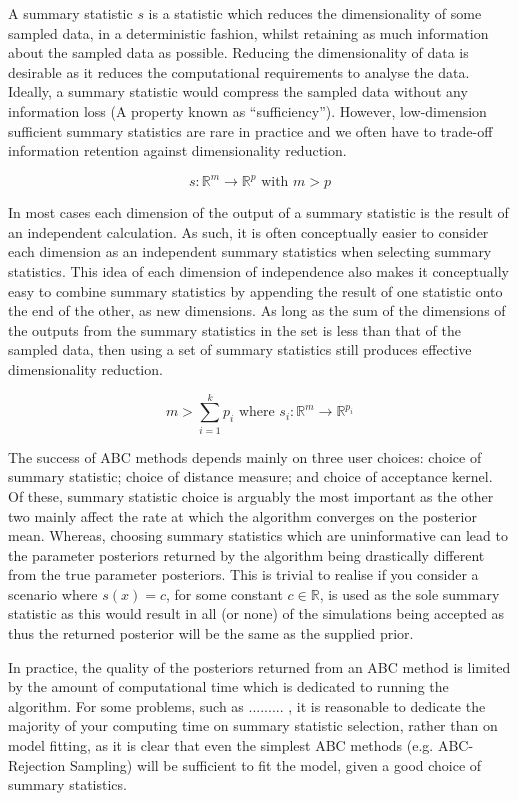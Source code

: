 \documentclass[11pt,a4paper]{article}
\theoremstyle{break}
\begin{document}
  \par A summary statistic $s$ is a statistic which reduces the dimensionality of some sampled data, in a deterministic fashion, whilst retaining as much information about the sampled data as possible. Reducing the dimensionality of data is desirable as it reduces the computational requirements to analyse the data. Ideally, a summary statistic would compress the sampled data without any information loss (A property known as ``sufficiency''). However, low-dimension sufficient summary statistics are rare in practice and we often have to trade-off information retention against dimensionality reduction.

  \[ s:\mathbb{R}^m\to\mathbb{R}^p\text{ with }m>p \]

  \par In most cases each dimension of the output of a summary statistic is the result of an independent calculation. As such, it is often conceptually easier to consider each dimension as an independent summary statistics when selecting summary statistics. This idea of each dimension of independence also makes it conceptually easy to combine summary statistics by appending the result of one statistic onto the end of the other, as new dimensions. %
  As long as the sum of the dimensions of the outputs from the summary statistics in the set is less than that of the sampled data, then using a set of summary statistics still produces effective dimensionality reduction.

  \[ m>\sum_{i=1}^kp_i\text{ where }s_i:\mathbb{R}^m\to\mathbb{R}^{p_i} \]

  The success of ABC methods depends mainly on three user choices: choice of summary statistic; choice of distance measure; and choice of acceptance kernel. Of these, summary statistic choice is arguably the most important as the other two mainly affect the rate at which the algorithm converges on the posterior mean. Whereas, choosing summary statistics which are uninformative can lead to the parameter posteriors returned by the algorithm being drastically different from the true parameter posteriors. This is trivial to realise if you consider a scenario where $s(x)=c$, for some constant $c\in\mathbb{R}$, is used as the sole summary statistic as this would result in all (or none) of the simulations being accepted as thus the returned posterior will be the same as the supplied prior.

  \par In practice, the quality of the posteriors returned from an ABC method is limited by the amount of computational time which is dedicated to running the algorithm. For some problems, such as ......... %
  , it is reasonable to dedicate the majority of your computing time on summary statistic selection, rather than on model fitting, as it is clear that even the simplest ABC methods (e.g. ABC-Rejection Sampling) will be sufficient to fit the model, given a good choice of summary statistics.
\end{document}
